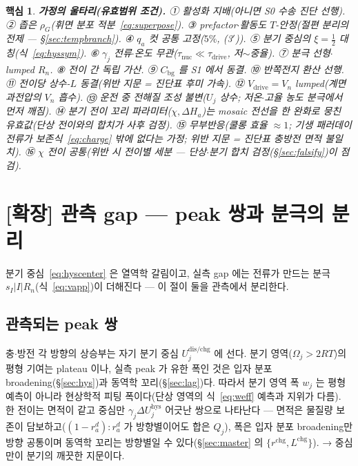 \documentclass[11pt,a4paper]{article}
\newtheorem*{keybox}{핵심}
\newcommand{\drive}{\mathrm{drive}}
\newcommand{\bg}{\mathrm{bg}}
\newcommand{\dis}{\mathrm{dis}}
\newcommand{\chg}{\mathrm{chg}}
\newcommand{\hys}{\mathrm{hys}}
\begin{document}
\begin{keybox}
\textbf{가정의 울타리(유효범위 조건).}
① 활성화 지배(아니면 S0 수송 진단 선행).
② 좁은 $\rho_G$(휘면 분포 적분~\eqref{eq:superpose}).
③ prefactor$\cdot$활동도 $T$-안정(절편 분리의 전제 — \S\ref{sec:tempbranch}).
④ $q_a$ 컷 공통 고정($5\%$, (3$'$)).
⑤ 분기 중심의 $\xi=\tfrac12$ 대칭(식~\eqref{eq:hyssym}).
⑥ $\gamma_j$ 전류$\cdot$온도 무관($\tau_{\mathrm{nuc}}\ll\tau_{\mathrm{drive}}$, 저$\sim$중율).
⑦ 분극 선형$\cdot$lumped $R_n$.
⑧ 전이 간 독립 가산.
⑨ $C_\bg$ 를 S1 에서 동결.
⑩ 반쪽전지 환산 선행.
⑪ 전이당 상수-$L$ 동결(위반 지문 = 진단표 후미 가속).
⑫ $V_\drive=V_n$ lumped(계면 과전압의 $V_n$ 흡수).
⑬ 운전 중 전해질 조성 불변($U_j$ 상수; 저온$\cdot$고율 농도 분극에서 먼저 깨짐).
⑭ 분기 전이 꼬리 파라미터($\chi,\Delta H_a$)는 mosaic 전선을 한 완화로 뭉친 \emph{유효값}(단상 전이와의 합치가 사후 검정).
⑮ 무부반응(쿨롱 효율 $\approx1$; 기생 패러데이 전류가 보존식~\eqref{eq:charge} 밖에 없다는 가정; 위반 지문 = 진단표 충방전 면적 불일치).
⑯ $\chi$ 전이 공통(위반 시 전이별 세분 — 단상$\cdot$분기 합치 검정(\S\ref{sec:falsify})이 점검).
\end{keybox}

\section{[확장] 관측 gap — peak 쌍과 분극의 분리}\label{sec:hyspol}
분기 중심~\eqref{eq:hyscenter} 은 열역학 갈림이고, 실측 gap 에는 전류가 만드는 분극 $s_I|I|R_n$(식~\eqref{eq:vapp})이 더해진다 — 이 절이 둘을 관측에서 분리한다.

\subsection{관측되는 peak 쌍}\label{sec:hyspeak}
충$\cdot$방전 각 방향의 상승부는 자기 분기 중심 $U_j^{\dis/\chg}$ 에 선다. 분기 영역($\Omega_j>2RT$)의 평형 기여는 plateau 이나, 실측 peak 가 유한 폭인 것은 입자 분포 broadening(\S\ref{sec:hys})과 동역학 꼬리(\S\ref{sec:lag})다. 따라서 분기 영역 폭 $w_j$ 는 평형 예측이 아니라 현상학적 피팅 폭이다(단상 영역의 식~\eqref{eq:weff} 예측과 지위가 다름). 한 전이는 면적이 같고 중심만 $\gamma_j\Delta U_j^\hys$ 어긋난 쌍으로 나타난다 — 면적은 물질량 보존이 담보하고($(1-r_a^d):r_a^d$ 가 방향별이어도 합은 $Q_j$), 폭은 입자 분포 broadening만 방향 공통이며 동역학 꼬리는 방향별일 수 있다(\S\ref{sec:master} 의 $\{r^{\chg},L^{\chg}\}$). → 중심만이 분기의 깨끗한 지문이다.
\end{document}
